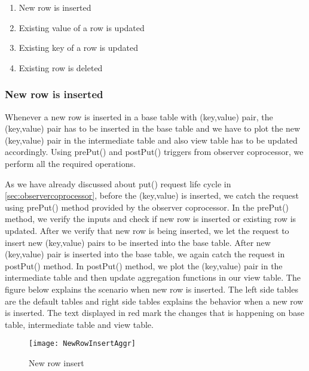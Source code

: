 \documentclass[11pt,a4paper,bibtotoc,idxtotoc,headsepline,footsepline,footexclude,BCOR12mm,DIV13]{scrbook}
\begin{document}
\begin{enumerate}
	\item New row is inserted
	\item Existing value of a row is updated
	\item Existing key of a row is updated
	\item Existing row is deleted
\end{enumerate}

\subsubsection{New row is inserted}
Whenever a new row is inserted in a base table with (key,value) pair, the (key,value) pair has to be inserted in the base table and we have to plot the new (key,value) pair in the intermediate table and also view table has to be updated accordingly. Using prePut() and postPut() triggers from observer coprocessor, we perform all the required operations.

As we have already discussed about put() request life cycle in \ref{sec:observercoprocessor}, before the (key,value) is inserted, we catch the request using prePut() method provided by the observer coprocessor. In the prePut() method, we verify the inputs and check if new row is inserted or existing row is updated. After we verify that new row is being inserted, we let the request to insert new (key,value) pairs to be inserted into the base table. After new (key,value) pair is inserted into the base table, we again catch the request in postPut() method. In postPut() method, we plot the (key,value) pair in the intermediate table and then update aggregation functions in our view table. The figure below explains the scenario when new row is inserted. The left side tables are the default tables and right side tables explains the behavior when a new row is inserted. The text displayed in red mark the changes that is happening on base table, intermediate table and view table. 
\begin{figure}
	\centering
	\texttt{[image: NewRowInsertAggr]}
	\caption{New row insert}
	\label{sec:newrowinsertagggregation}
	
\end{figure}

\newpage
\end{document}
